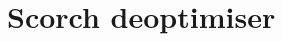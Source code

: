 \documentclass[a4paper,12pt,twoside]{../includes/ThesisStyle}
\begin{document}








\section{Scorch deoptimiser}
\end{document}
